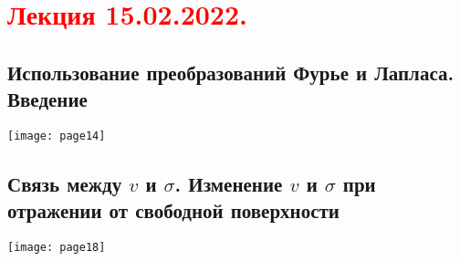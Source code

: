 \documentclass[main.tex]{subfiles}
\begin{document}
\section{\textcolor{red}{Лекция 15.02.2022.}}

\subsection{Использование преобразований Фурье и Лапласа. Введение}
\texttt{[image: page14]}




\subsection[Связь между v и σ. Изменение v и σ при отражении от свободной поверхности]{Связь между $v$ и $\sigma$. Изменение $v$ и $\sigma$ при отражении от свободной поверхности}
\texttt{[image: page18]}





\end{document}
